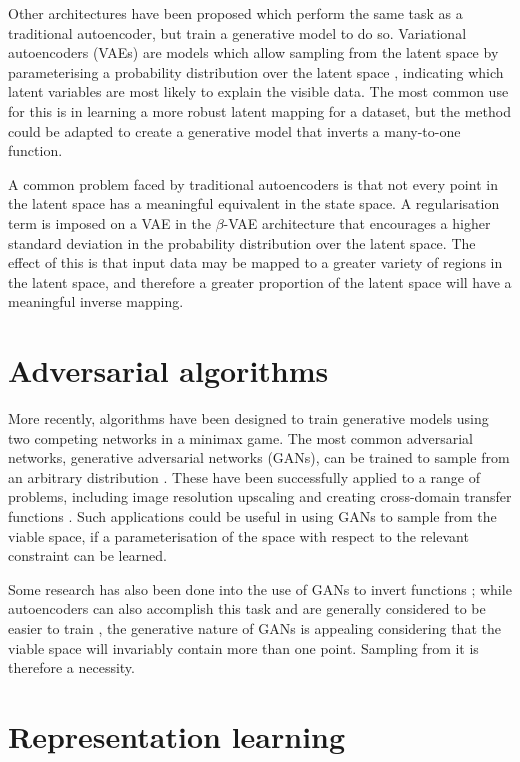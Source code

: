 \documentclass[../../main.tex]{subfiles}
\begin{document}
Other architectures have been proposed which perform the same task as a traditional autoencoder, but train a generative model to do so.
Variational autoencoders (VAEs) are models which allow sampling from the latent space by parameterising a probability distribution over the latent space \cite{kingma14}, indicating which latent variables are most likely to explain the visible data.
The most common use for this is in learning a more robust latent mapping for a dataset, but the method could be adapted to create a generative model that inverts a many-to-one function.

A common problem faced by traditional autoencoders is that not every point in the latent space has a meaningful equivalent in the state space.
A regularisation term is imposed on a VAE in the $\beta$-VAE architecture \cite{higgins16} that encourages a higher standard deviation in the probability distribution over the latent space.
The effect of this is that input data may be mapped to a greater variety of regions in the latent space, and therefore a greater proportion of the latent space will have a meaningful inverse mapping.

\section{Adversarial algorithms}

More recently, algorithms have been designed to train generative models using two competing networks in a minimax game.
The most common adversarial networks, generative adversarial networks (GANs), can be trained to sample from an arbitrary distribution \cite{goodfellow14, horger18}.
These have been successfully applied to a range of problems, including image resolution upscaling \cite{ledig17} and creating cross-domain transfer functions \cite{zhu18}.
Such applications could be useful in using GANs to sample from the viable space, if a parameterisation of the space with respect to the relevant constraint can be learned.

Some research has also been done into the use of GANs to invert functions \cite{anirudh18}; while autoencoders can also accomplish this task and are generally considered to be easier to train \cite{bang18}, the generative nature of GANs is appealing considering that the viable space will invariably contain more than one point.
Sampling from it is therefore a necessity.

\section{Representation learning}
\end{document}
